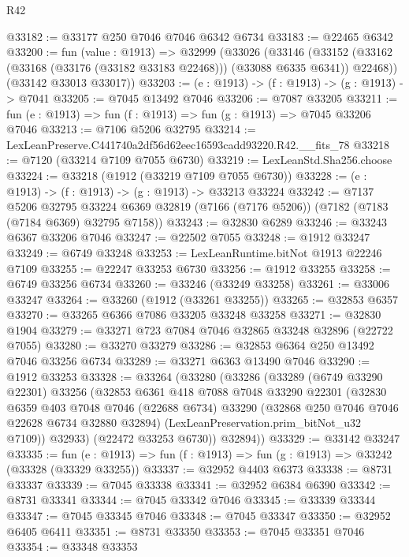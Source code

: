 \begin{lexlean}{R42}
\begin{coremodule}
{@33182 := @33177 @250 @7046 @7046 @6342 @6734
@33183 := @22465 @6342
@33200 := fun (value : @1913) =>
  @32999
    (@33026
      (@33146
        (@33152 (@33162 (@33168 (@33176 (@33182 @33183 @22468))) (@33088 @6335 @6341)) @22468))
      (@33142 @33013 @33017))
@33203 := (e : @1913) -> (f : @1913) -> (g : @1913) -> @7041
@33205 := @7045 @13492 @7046
@33206 := @7087 @33205
@33211 := fun (e : @1913) => fun (f : @1913) => fun (g : @1913) => @7045 @33206 @7046
@33213 := @7106 @5206 @32795
@33214 := LexLeanPreserve.C441740a2df56d62eec16593cadd93220.R42.__fits_78
@33218 := @7120 (@33214 @7109 @7055 @6730)
@33219 := LexLeanStd.Sha256.choose
@33224 := @33218 (@1912 (@33219 @7109 @7055 @6730))
@33228 := (e : @1913) -> (f : @1913) -> (g : @1913) -> @33213 @33224
@33242 := @7137
    @5206
    @32795
    @33224
    @6369
    @32819
    (@7166 (@7176 @5206))
    (@7182 (@7183 (@7184 @6369) @32795 @7158))
@33243 := @32830 @6289
@33246 := @33243 @6367 @33206 @7046
@33247 := @22502 @7055
@33248 := @1912 @33247
@33249 := @6749 @33248
@33253 := LexLeanRuntime.bitNot @1913 @22246 @7109
@33255 := @22247 @33253 @6730
@33256 := @1912 @33255
@33258 := @6749 @33256 @6734
@33260 := @33246 (@33249 @33258)
@33261 := @33006 @33247
@33264 := @33260 (@1912 (@33261 @33255))
@33265 := @32853 @6357
@33270 := @33265 @6366 @7086 @33205 @33248 @33258
@33271 := @32830 @1904
@33279 := @33271 @723 @7084 @7046 @32865 @33248 @32896 (@22722 @7055)
@33280 := @33270 @33279
@33286 := @32853 @6364 @250 @13492 @7046 @33256 @6734
@33289 := @33271 @6363 @13490 @7046
@33290 := @1912 @33253
@33328 := @33264
    (@33280
      (@33286
        (@33289
          (@6749 @33290 @22301)
          @33256
          (@32853
            @6361
            @418
            @7088
            @7048
            @33290
            @22301
            (@32830
              @6359
              @403
              @7048
              @7046
              (@22688 @6734)
              @33290
              (@32868 @250 @7046 @7046 @22628 @6734 @32880 @32894)
              (LexLeanPreservation.prim_bitNot_u32 @7109))
            @32933)
          (@22472 @33253 @6730))
        @32894))
@33329 := @33142 @33247
@33335 := fun (e : @1913) => fun (f : @1913) => fun (g : @1913) => @33242 (@33328 (@33329 @33255))
@33337 := @32952 @4403 @6373
@33338 := @8731 @33337
@33339 := @7045 @33338
@33341 := @32952 @6384 @6390
@33342 := @8731 @33341
@33344 := @7045 @33342 @7046
@33345 := @33339 @33344
@33347 := @7045 @33345 @7046
@33348 := @7045 @33347
@33350 := @32952 @6405 @6411
@33351 := @8731 @33350
@33353 := @7045 @33351 @7046
@33354 := @33348 @33353
}
\end{coremodule}
\end{lexlean}
